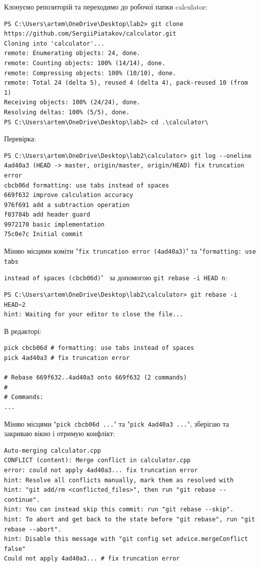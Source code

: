 \documentclass[12pt,a4paper]{article}
\begin{document}
    Клонуємо репозиторій та переходимо до робочої папки calculator:
    \begin{verbatim}
PS C:\Users\artem\OneDrive\Desktop\lab2> git clone https://github.com/SergiiPiatakov/calculator.git
Cloning into 'calculator'...
remote: Enumerating objects: 24, done.
remote: Counting objects: 100% (14/14), done.
remote: Compressing objects: 100% (10/10), done.
remote: Total 24 (delta 5), reused 4 (delta 4), pack-reused 10 (from 1)
Receiving objects: 100% (24/24), done.
Resolving deltas: 100% (5/5), done.
PS C:\Users\artem\OneDrive\Desktop\lab2> cd .\calculator\
    \end{verbatim}

    Перевірка:
    \begin{verbatim}
PS C:\Users\artem\OneDrive\Desktop\lab2\calculator> git log --oneline
4ad40a3 (HEAD -> master, origin/master, origin/HEAD) fix truncation error
cbcb06d formatting: use tabs instead of spaces
669f632 improve calculation accuracy
976f691 add a subtraction operation
f03784b add header guard
9972170 basic implementation
75c0e7c Initial commit
    \end{verbatim}

    Міняю місцями коміти "\texttt{fix truncation error (4ad40a3)}" та "\texttt{formatting: use tabs}
    
    \texttt{instead of spaces (cbcb06d)}" \, за допомогою \texttt{git rebase -i HEAD~n}:
    \begin{verbatim}
PS C:\Users\artem\OneDrive\Desktop\lab2\calculator> git rebase -i HEAD~2
hint: Waiting for your editor to close the file...
    \end{verbatim}

    В редакторі:
    \begin{verbatim}
pick cbcb06d # formatting: use tabs instead of spaces
pick 4ad40a3 # fix truncation error

# Rebase 669f632..4ad40a3 onto 669f632 (2 commands)
#
# Commands:
...
    \end{verbatim}

    Міняю місцями "\texttt{pick cbcb06d ...}" та "\texttt{pick 4ad40a3 ...}", зберігаю та закриваю вікно і отримую конфлікт:

    \begin{verbatim}
Auto-merging calculator.cpp
CONFLICT (content): Merge conflict in calculator.cpp
error: could not apply 4ad40a3... fix truncation error
hint: Resolve all conflicts manually, mark them as resolved with
hint: "git add/rm <conflicted_files>", then run "git rebase --continue".
hint: You can instead skip this commit: run "git rebase --skip".
hint: To abort and get back to the state before "git rebase", run "git rebase --abort".
hint: Disable this message with "git config set advice.mergeConflict false"
Could not apply 4ad40a3... # fix truncation error
    \end{verbatim}
\end{document}
